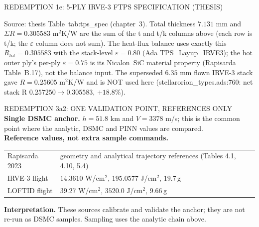\documentclass[aspectratio=169,11pt]{beamer}
\begin{document}
\begin{frame}{REDEMPTION 1e: 5-PLY IRVE-3 FTPS SPECIFICATION (THESIS)}
  \scriptsize
  \par\vspace{0.25cm}
  \par{\footnotesize Source: thesis Table~tab:tps\_spec (chapter~3). Total
  thickness $7.131$ mm and $\Sigma R=0.305583$ m$^2$K/W are the sum of the
  t and t/k columns above (each row is t/k; the $\varepsilon$ column does not
  sum). The heat-flux balance uses exactly this $R_{tot}=0.305583$ with the
  stack-level $\varepsilon=0.80$ (Ada TPS\_Layup\_IRVE3); the hot outer ply's
  per-ply $\varepsilon=0.75$ is its Nicalon~SiC material property
  (Rapisarda Table~B.17), not the balance input. The superseded $6.35$ mm
  flown IRVE-3 stack gave $R=0.25605$ m$^2$K/W and is NOT used here
  (stellarorion\_types.ads:760: net stack R $0.257250\to0.305583$, $+18.8\%$).}
\end{frame}
\begin{frame}{REDEMPTION 3a2: ONE VALIDATION POINT, REFERENCES ONLY}
  \small
  \textbf{Single DSMC anchor.} $h=51.8$ km and $V=3378$ m/s; this is the
  common point where the analytic, DSMC and PINN values are compared.\\
  \textbf{Reference values, not extra sample commands.}
  \begin{tabular}{@{}p{3.1cm}p{9.0cm}@{}}
  Rapisarda 2023 & geometry and analytical trajectory references (Tables 4.1, 4.10, 5.4)\\
  IRVE-3 flight & $14.3610$ W/cm$^2$, $195.0577$ J/cm$^2$, $19.7$\,g\\
  LOFTID flight & $39.27$ W/cm$^2$, $3520.0$ J/cm$^2$, $9.66$\,g\\
  \end{tabular}
  \vspace{0.2cm}
  \textbf{Interpretation.} These sources calibrate and validate the anchor; they
  are not re-run as DSMC samples. Sampling uses the analytic chain above.
\end{frame}
\end{document}
